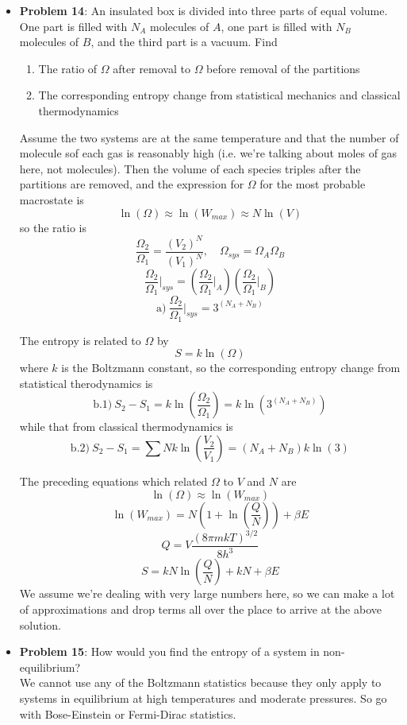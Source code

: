 \documentclass[11pt]{article}
\newcommand{\Item}[1]{\item \textbf{#1}:}
\newcommand{\Problem}[1]{\Item{Problem #1}}
\begin{document}
\begin{itemize}
\Problem{14} An insulated box is divided into three parts of equal volume. One part is filled with $N_A$ molecules of $A$, one part is filled with $N_B$ molecules of $B$, and the third part is a vacuum. Find
\begin{enumerate}[label = \alph*)]
\item The ratio of $\Omega$ after removal to $\Omega$ before removal of the partitions
\item The corresponding entropy change from statistical mechanics and classical thermodynamics
\end{enumerate}

Assume the two systems are at the same temperature and that the number of molecule sof each gas is reasonably high (i.e. we're talking about moles of gas here, not molecules). Then the volume of each species triples after the partitions are removed, and the expression for $\Omega$ for the most probable macrostate is
$$\ln(\Omega) \approx \ln(W_{max}) \approx N\ln(V)$$
so the ratio is
$$\frac{\Omega_2}{\Omega_1} = \frac{(V_2)^N}{(V_1)^N},\quad \Omega_{sys} = \Omega_A\Omega_B$$
$$\frac{\Omega_2}{\Omega_1}\Big|_{sys} = \left(\frac{\Omega_2}{\Omega_1}\Big|_A\right)\left(\frac{\Omega_2}{\Omega_1}\Big|_B\right)$$
$$\textrm{a})\ \frac{\Omega_2}{\Omega_1}\Big|_{sys} = 3^{(N_A+N_B)}$$

The entropy is related to $\Omega$ by
$$S = k\ln(\Omega)$$
where $k$ is the Boltzmann constant, so the corresponding entropy change from statistical therodynamics is
$$\textrm{b.1})\ S_2 - S_1 = k\ln\left(\frac{\Omega_2}{\Omega_1}\right) = k\ln\left(3^{(N_A+N_B)}\right)$$
while that from classical thermodynamics is
$$\textrm{b.2})\ S_2 - S_1 = \sum Nk\ln\left(\frac{V_2}{V_1}\right) = (N_A+N_B)k\ln(3)$$

The preceding equations which related $\Omega$ to $V$ and $N$ are
$$\ln(\Omega)\approx\ln(W_{max})$$
$$\ln(W_{max}) = N\left(1+\ln\left(\frac{Q}{N}\right)\right)+\beta E$$
$$Q=V\frac{(8\pi mkT)^{3/2}}{8h^3}$$
$$S = kN\ln\left(\frac{Q}{N}\right) + kN + \beta E$$
We assume we're dealing with very large numbers here, so we can make a lot of approximations and drop terms all over the place to arrive at the above solution.

\Problem{15} How would you find the entropy of a system in non-equilibrium?\\

We cannot use any of the Boltzmann statistics because they only apply to systems in equilibrium at high temperatures and moderate pressures. So go with Bose-Einstein or Fermi-Dirac statistics.


\end{itemize}
\end{document}
